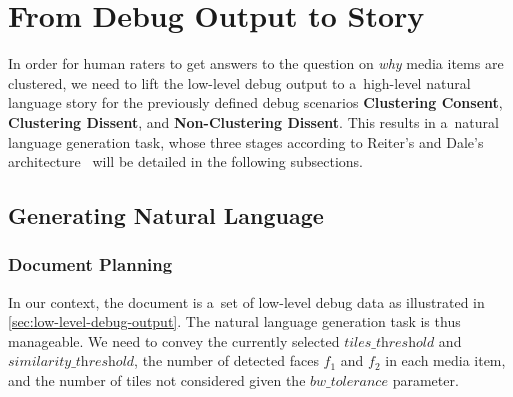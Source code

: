 \documentclass{article}
\begin{document}

\section{From Debug Output to Story}
\label{sec:from-debug-output-to-story}
In order for human raters to get answers to the question on \emph{why} media items are clustered, we need to lift the low-level debug output to a~high-level natural language story for the previously defined debug scenarios \textbf{Clustering Consent}, \textbf{Clustering Dissent}, and \textbf{Non-Clustering Dissent}. This results in a~natural language generation task, whose three stages according to Reiter's and Dale's architecture~\cite{reiter2000building} will be detailed in the following subsections.

\subsection{Generating Natural Language}

\subsubsection{Document Planning}
In our context, the document is a~set of low-level debug data as illustrated in \autoref{sec:low-level-debug-output}. The natural language generation task is thus manageable. We need to convey the currently selected $\textit{tiles\_threshold}$ and $\textit{similarity\_threshold}$, the number of detected faces $f_1$ and $f_2$ in each media item, and the number of tiles not considered given the $\textit{bw\_tolerance}$ parameter.
\end{document}

